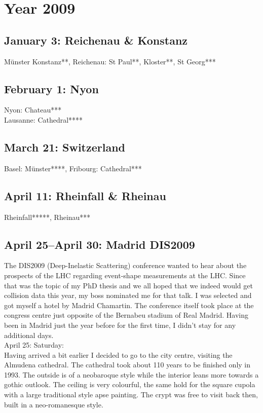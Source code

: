 \chapter{Year 2009}
\label{2009}

\section{January 3: Reichenau \& Konstanz}
\label{2009:Reichenau}

M\"unster Konstanz**, Reichenau: St Paul**, Kloster**, St Georg***

\section{February 1: Nyon}
\label{2009:Nyon}

Nyon: Chateau***\\
Lausanne: Cathedral****

\section{March 21: Switzerland}
\label{2009:Switzerland}

Basel: M\"unster****, Fribourg: Cathedral***

\section{April 11: Rheinfall \& Rheinau}
\label{2009:Rheinfall}

Rheinfall*****, Rheinau***

\section{April 25--April 30: Madrid DIS2009}
\label{2009:Madrid}

The DIS2009 (Deep-Inelastic Scattering) conference wanted to hear about the prospects of the LHC regarding event-shape measurements at the LHC. Since that was the topic of my PhD thesis and we all hoped that we indeed would get collision data this year, my boss nominated me for that talk. I was selected and got myself a hotel by Madrid Chamartin. The conference itself took place at the congress centre just opposite of the Bernabeu stadium of Real Madrid. Having been in Madrid just the year before for the first time, I didn't stay for any additional days.\\

April 25: Saturday:\\
Having arrived a bit earlier I decided to go to the city centre, visiting the Almudena cathedral. The cathedral took about 110 years to be finished only in 1993. The outside is of a neobaroque style while the interior leans more towards a gothic outlook. The ceiling is very colourful, the same hold for the square cupola with a large traditional style apse painting. The crypt was free to visit back then, built in a neo-romanesque style.\\

